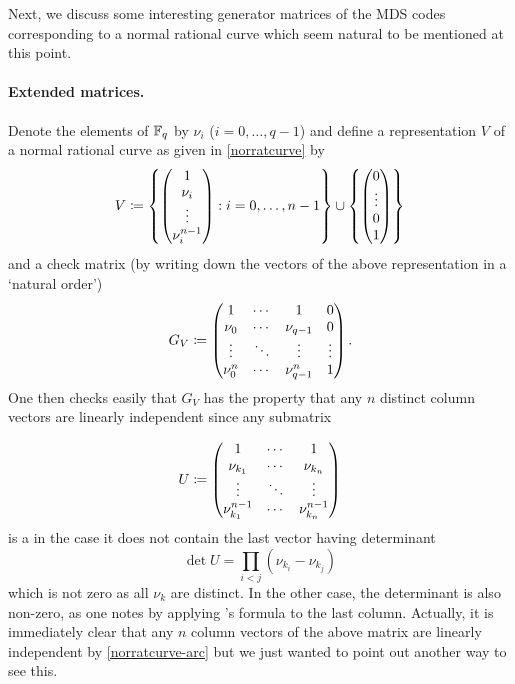 Next, we discuss some interesting generator matrices of the MDS codes corresponding to a normal rational curve which seem natural to be mentioned at this point.

\paragraph{Extended  matrices.}
Denote the elements of $\mathbb{F}_{q}$ by $\nu_i$ ($i=0,\ldots,q-1$) and define a representation $V$ of a normal rational curve as given in \autoref{norratcurve} by
$$
V\defeq\set{\begin{pmatrix} 1 \\ \nu_i\\ \vdots\\ \nu_i^{n-1}\end{pmatrix}}[i=\range 0 {n-1}]\setjoin\set{
        \begin{pmatrix}
            0 \\
            \vdots \\
            0 \\
            1
        \end{pmatrix}
}
$$
and a check matrix (by writing down the vectors of the above representation in a `natural order')
$$
G_V\mathrel{\mathrel{\mathop:}\mkern-1.2mu=}
\begin{pmatrix}
    1      & \cdots & 1      & 0      \\
    \nu_0    & \cdots & \nu_{q-1}    & 0      \\
    \vdots & \ddots & \vdots & \vdots \\
    \nu_0^n  & \cdots & \nu_{q-1}^n  & 1
\end{pmatrix}\textrm{.}
$$
One then checks easily that $G_V$ has the property that any $n$ distinct column vectors are linearly independent since any submatrix

$$
U \mathrel{\mathrel{\mathop:}\mkern-1.2mu=}\begin{pmatrix}
    1             & \cdots & 1       \\
    \nu_{k_1}       & \cdots & \nu_{k_n} \\
    \vdots        & \ddots & \vdots  \\
    \nu_{k_1}^{n-1} & \cdots & \nu_{k_n}^{n-1} 
\end{pmatrix}
$$
is a  in the case it does not contain the last vector having determinant
$$
    \det U = \prod_{i<j}{(\nu_{k_i}-\nu_{k_j})}
$$%
which is not zero as all $\nu_k$ are distinct. In the other case, the determinant is also non-zero, as one notes by applying 's formula to the last column. Actually, it is immediately clear that any $n$ column vectors of the above matrix are linearly independent by \autoref{norratcurve-arc} but we just wanted to point out another way to see this.

